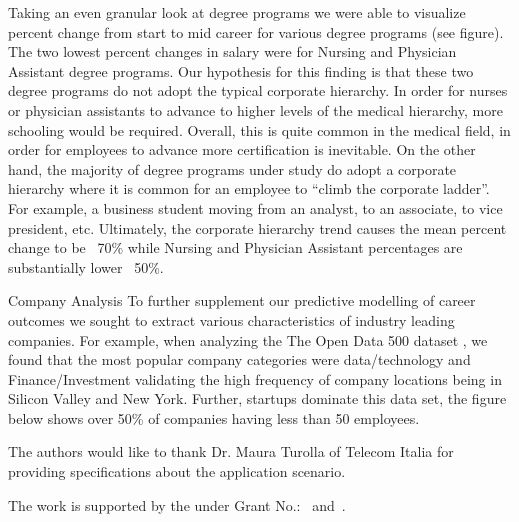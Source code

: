 Taking an even granular look at degree programs we were able to visualize percent change from start to mid career for various degree programs (see figure). The two lowest percent changes in salary were for Nursing and Physician Assistant degree programs. Our hypothesis for this finding is that these two degree programs do not adopt the typical corporate hierarchy. In order for nurses or physician assistants to advance to higher levels of the medical hierarchy, more schooling would be required. Overall, this is quite common in the medical field, in order for employees to advance more certification is inevitable. On the other hand, the majority of degree programs under study do adopt a corporate hierarchy where it is common for an employee to  “climb the corporate ladder”. For example, a business student moving from an analyst, to an associate, to vice president, etc. Ultimately, the corporate hierarchy trend causes the mean percent change to be ~70\% while Nursing and Physician Assistant percentages are substantially lower ~50\%. 

Company Analysis 
To further supplement our predictive modelling of career outcomes we sought to extract various characteristics of industry leading companies. For example, when analyzing the The Open Data 500 dataset \cite{kaggleCompanies}, we found that the most popular company categories were data/technology and Finance/Investment validating the high frequency of company locations being in Silicon Valley and New York. Further, startups dominate this data set, the figure below shows over 50\% of companies having less than 50 employees.


\begin{acks}

The authors would like to thank Dr. Maura Turolla of Telecom
Italia for providing specifications about the application scenario.

The work is supported by the  under Grant
No.:~
and~.


\end{acks}




